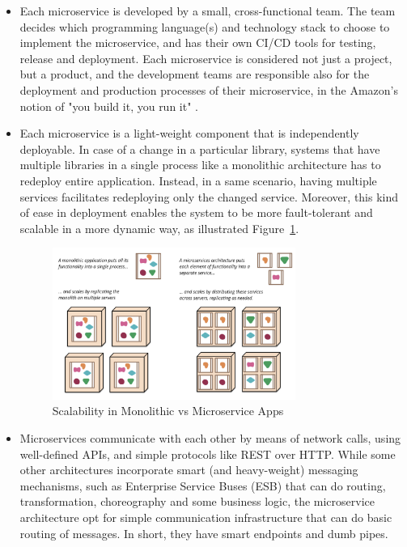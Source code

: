 \documentclass{Configuration_Files/PoliMi3i_thesis}
\begin{document}
\begin{itemize}
    \item Each microservice is developed by a small, cross-functional team.
    The team decides which programming language(s) and technology stack to choose to implement the microservice, and has their own CI/CD tools for testing, release and deployment.
    Each microservice is considered not just a project, but a product, and the development teams are responsible also for the deployment and production processes of their microservice, in the Amazon's notion of "you build it, you run it" \cite{youbuild}.
    
    \item Each microservice is a light-weight component that is independently deployable. In case of a change in a particular library, systems that have multiple libraries in a single process like a monolithic architecture has to redeploy entire application. Instead, in a same scenario, having multiple services facilitates redeploying only the changed service. Moreover, this kind of ease in deployment enables the system to be more fault-tolerant and scalable in a more dynamic way, as illustrated Figure~\ref{fig:scalability}.
    
    \begin{figure}[H]
    \centering
    \includegraphics[width=0.75\textwidth]{myImages/scalable.png}
    \caption{Scalability in Monolithic vs Microservice Apps}
    \label{fig:scalability}
    \end{figure}

    \item Microservices communicate with each other by means of network calls, using well-defined APIs, and simple protocols like REST over HTTP. While some other architectures incorporate smart (and heavy-weight) messaging mechanisms, such as Enterprise Service Buses (ESB) that can do routing, transformation, choreography and some business logic, the microservice architecture opt for simple communication infrastructure that can do basic routing of messages. In short, they have smart endpoints and dumb pipes.


\end{itemize}
\end{document}
